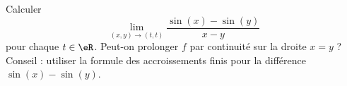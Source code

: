 

\begin{exercice}\label{exoreserve0002}

	Calculer
	\begin{equation}
		\lim_{(x,y)\to(t,t)}\frac{ \sin(x)-\sin(y) }{ x-y }
	\end{equation}
	pour chaque $t\in\eR$. Peut-on prolonger $f$ par continuité sur la droite $x=y$ ?
	Conseil : utiliser la formule des accroissements finis pour la différence $\sin(x)-\sin(y)$.

\end{exercice}
